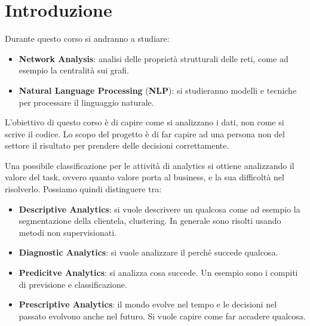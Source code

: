 \chapter{Introduzione}
Durante questo corso si andranno a studiare:
\begin{itemize}
    \item \textbf{Network Analysis}: analisi delle proprietà strutturali delle
          reti, come ad esempio la centralità sui grafi.
    \item \textbf{Natural Language Processing} (\textbf{NLP}): si studieranno
          modelli e tecniche per processare il linguaggio naturale.
\end{itemize}
\begin{nota}
    L'obiettivo di questo corso è di capire come si analizzano i dati, non come
    si scrive il codice. Lo scopo del progetto è di far capire ad una persona non
    del settore il risultato per prendere delle decisioni correttamente.
\end{nota}

Una possibile classificazione per le attività di analytics si ottiene analizzando
il valore del task, ovvero quanto valore porta al business, e la sua difficoltà
nel risolverlo. Possiamo quindi distinguere tra:
\begin{itemize}
    \item \textbf{Descriptive Analytics}: si vuole descrivere un qualcosa come
          ad esempio la segmentazione della clientela, clustering. In generale
          sono risolti usando metodi non supervisionati.
    \item \textbf{Diagnostic Analytics}: si vuole analizzare il perché succede
          qualcosa.
    \item \textbf{Predicitve Analytics}: si analizza cosa succede. Un esempio
          sono i compiti di previsione e classificazione.
    \item \textbf{Prescriptive Analytics}: il mondo evolve nel tempo e le
          decisioni nel passato evolvono anche nel futuro. Si vuole capire come
          far accadere qualcosa.
\end{itemize}

